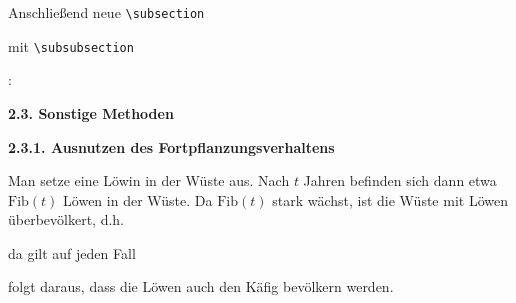 \documentclass["WS\space 16-17\space -\space LaTeX-Kurs\space -\space Praesentation\space -\space 1.tex"]{subfiles}
\begin{document}
\begin{frame}[fragile]
	\Aufgabee
		Anschließend neue \lstinline[basicstyle=\normalfont\normalsize]|\subsection|
		
		\textrm{}
		
		mit \lstinline[basicstyle=\normalfont\normalsize]|\subsubsection|
		
		\textrm{}:
	\begin{outputbox}
    { \Large\textbf{2.3. Sonstige Methoden}}
		
    { \large\textbf{2.3.1. Ausnutzen des Fortpflanzungsverhaltens} } 

    Man setze eine Löwin in der Wüste aus. Nach $t$ Jahren befinden sich dann etwa $\mathrm{Fib}(t)$ Löwen in der Wüste. Da $\mathrm{Fib}(t)$ stark wächst, ist die Wüste mit Löwen überbevölkert, d.h.

    da gilt auf jeden Fall

    folgt daraus, dass die Löwen auch den Käfig bevölkern werden.
    \end{outputbox}
	\vspace{0.3cm}
\end{frame}
\end{document}
